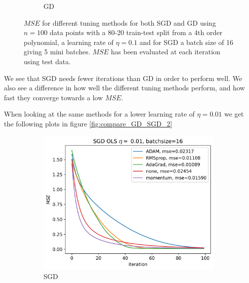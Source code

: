 \documentclass[11pt]{article}
\begin{document}
\begin{figure}[H]
\begin{subfigure}{.5\textwidth}
        \caption{GD}
        \label{fig:}
    \end{subfigure}
    \caption{$MSE$ for different tuning methods for both SGD and GD using $n=100$ data points with a 80-20 train-test split from a 4th order polynomial, a learning rate of $\eta=0.1$ and for SGD a batch size of 16 giving 5 mini batches. $MSE$ has been evaluated at each iteration using test data.}
    \label{fig:compare_GD_SGD}
\end{figure}
We see that SGD needs fewer iterations than GD in order to perform well. We also see a difference in how well the different tuning methods perform, and how fast they converge towards a low $MSE$.

When looking at the same methods for a lower learning rate of $\eta=0.01$ we get the following plots in figure \ref{fig:compare_GD_SGD_2}
\begin{figure}[H]
    \begin{subfigure}{.5\textwidth}
        \centering
        \includegraphics[width=\textwidth]{../figures/SGD_methods_OLS_eta_0.01.png}
        \caption{SGD}
        \label{fig:}
    \end{subfigure}
    \begin{subfigure}{.5\textwidth}
        \centering

\end{subfigure}
\end{figure}
\end{document}
